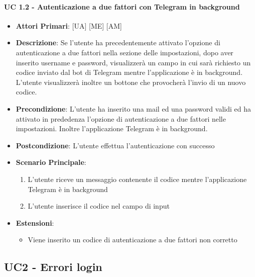 			\paragraph{UC 1.2 - Autenticazione a due fattori con Telegram in background}
			\begin{itemize}
				\item \textbf{Attori Primari}: [UA] [ME] [AM]
				\item \textbf{Descrizione}: Se l'utente ha precedentemente attivato l'opzione di autenticazione a due fattori nella sezione delle impostazioni, dopo aver inserito username e password, visualizzerà un campo in cui sarà richiesto un codice inviato dal bot di Telegram mentre l'applicazione è in background. L'utente visualizzerà inoltre un bottone che provocherà l'invio di un nuovo codice.
				\item \textbf{Precondizione}: L'utente ha inserito una mail ed una password validi ed ha attivato in prededenza l'opzione di autenticazione a due fattori nelle impostazioni. Inoltre l'applicazione Telegram è in background.
				\item \textbf{Postcondizione}: L'utente effettua l'autenticazione con successo
				\item \textbf{Scenario Principale}:
				\begin{enumerate}
					\item{L'utente riceve un messaggio contenente il codice mentre l'applicazione Telegram è in background}
					\item{L'utente inserisce il codice nel campo di input}
				\end{enumerate}	
				\item \textbf{Estensioni}:
					\begin{itemize}
						\item Viene inserito un codice di autenticazione a due fattori non corretto
					\end{itemize}
			\end{itemize}

		\subsection{UC2 - Errori login}
			
